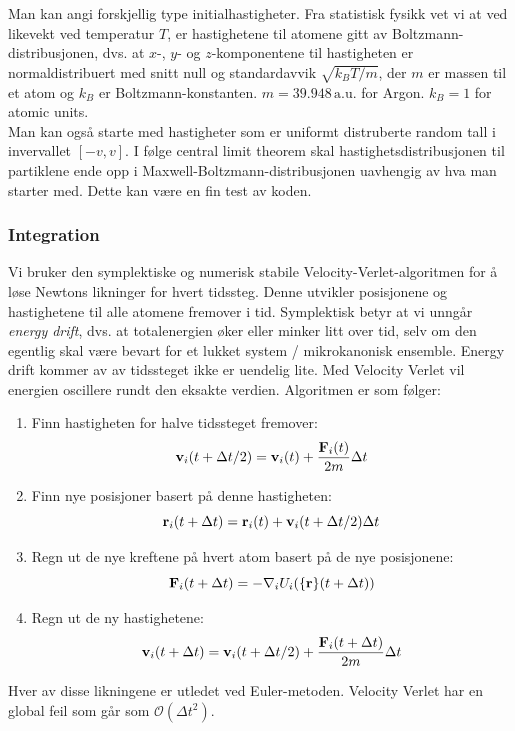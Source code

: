 \documentclass[english, a4paper]{article}
\begin{document}
\noindent
Man kan angi forskjellig type initialhastigheter.
Fra statistisk fysikk vet vi at ved likevekt ved temperatur $T$, er hastighetene til atomene
gitt av Boltzmann-distribusjonen, dvs. at $x$-, $y$- og $z$-komponentene til hastigheten er
normaldistribuert med snitt null og standardavvik $\sqrt{k_BT/m}$, der $m$ er massen til et atom
og $k_B$ er Boltzmann-konstanten. $m = 39.948\,\textrm{a.u.}$ for Argon. $k_B = 1$
for atomic units. \\

\noindent
Man kan også starte med hastigheter som er uniformt distruberte random tall i invervallet $[-v,v]$.
I følge central limit theorem skal hastighetsdistribusjonen til partiklene ende opp i
Maxwell-Boltzmann-distribusjonen uavhengig av hva man starter med. Dette kan være en fin test av koden.

\subsubsection{Integration}
Vi bruker den symplektiske og numerisk stabile Velocity-Verlet-algoritmen for å løse 
Newtons likninger for hvert tidssteg. Denne utvikler posisjonene og hastighetene til alle 
atomene fremover i tid. Symplektisk betyr at vi unngår \textit{energy drift}, dvs. at totalenergien
øker eller minker litt over tid, selv om den egentlig skal være bevart for et lukket system / 
mikrokanonisk ensemble. Energy drift kommer av av tidssteget ikke er uendelig lite.
Med Velocity Verlet vil energien oscillere rundt den eksakte verdien. 
Algoritmen er som følger:
\begin{enumerate}
 \item Finn hastigheten for halve tidssteget fremover: 
 \begin{equation}
  {\bf v}_i(t + \Delta t/2) = {\bf v}_i(t) + \frac{{\bf F}_i(t)}{2m} \Delta t
 \end{equation}
 \item Finn nye posisjoner basert på denne hastigheten:
 \begin{equation}
  {\bf r}_i(t + \Delta t) = {\bf r}_i(t) + {\bf v}_i(t + \Delta t/2)\Delta t
 \end{equation}
 \item Regn ut de nye kreftene på hvert atom basert på de nye posisjonene:
 \begin{equation}
  {\bf F}_i(t + \Delta t) = -\nabla_iU_i({\bf \{r\}}(t + \Delta t))
 \end{equation}
 \item Regn ut de ny hastighetene:
 \begin{equation}
  {\bf v}_i(t + \Delta t) = {\bf v}_i(t+\Delta t/2) + \frac{{\bf F}_i(t + \Delta t)}{2m} \Delta t
 \end{equation}
\end{enumerate}
Hver av disse likningene er utledet ved Euler-metoden. Velocity Verlet har en global feil som 
går som $\mathcal{O}(\Delta t^2)$. 
\end{document}
